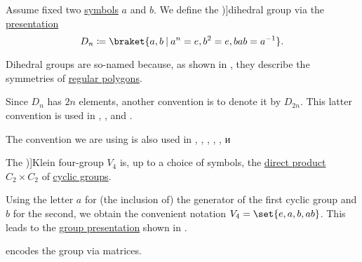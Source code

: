 \begin{definition}\label{def:dihedral_group}
  Assume fixed two \hyperref[def:formal_language/symbol]{symbols} \( a \) and \( b \). We define the \term[ru=группа диедра (\cite[161]{Винберг2014КурсАлгебры})]{dihedral group} via the \hyperref[def:group_presentation]{presentation}
  \begin{equation}\label{eq:def:dihedral_group}
    D_n \coloneqq \braket{ a, b \given a^n = e, b^2 = e, bab = a^{-1} }.
  \end{equation}
\end{definition}
\begin{comments}
  \item Dihedral groups are so-named because, as shown in , they describe the symmetries of \hyperref[def:regular_polygon]{regular polygons}.

  \item Since \( D_n \) has \( 2n \) elements, another convention is to denote it by \( D_{2n} \). This latter convention is used in
  \cite[exerc. 1.1.34(a)]{Lang2002Algebra},
  \cite[2]{Berger1987GeometryI},
  \cite[52]{Aluffi2009Algebra} and
  \cite[136]{Rotman2015AdvancedModernAlgebraPart1}.

  The convention we are using is also used in
  \cite[34]{Jacobson1985BasicAlgebraI},
  \cite[148]{Bourbaki1998Algebra1to3},
  \cite[121]{Knapp2006BasicAlgebra},
  \cite[example 8.2.3]{Steinberg2012RepresentationTheory},
  \cite[230]{Aigner1997CombinatorialTheory},
  \cite[example 4.1.11]{Винберг2014КурсАлгебры} и
  \cite[149]{Шафаревич1999ОсновныеПонятияАлгебры}
\end{comments}

\begin{definition}\label{def:klein_four_group}
  The \term[ru=четверная группа Клейна (\cite[189]{Винберг2014КурсАлгебры})]{Klein four-group} \( V_4 \) is, up to a choice of symbols, the \hyperref[def:first_order_direct_product]{direct product} \( C_2 \times C_2 \) of \hyperref[def:cyclic_group]{cyclic groups}.

  Using the letter \( a \) for (the inclusion of) the generator of the first cyclic group and \( b \) for the second, we obtain the convenient notation \( V_4 = \set{ e, a, b, ab } \). This leads to the \hyperref[def:group_presentation]{group presentation} shown in .
\end{definition}
\begin{comments}
  \item {} encodes the group via matrices.
\end{comments}

